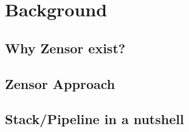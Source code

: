 \chapter{Background}

\section{Why Zensor exist?}


\section{Zensor Approach}


\section{Stack/Pipeline in a nutshell}







